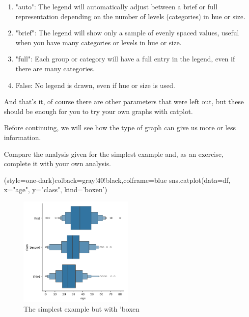 \documentclass[10pt]{extarticle}
\begin{document}
\begin{itemize}
    \begin{enumerate}
        \item "auto": The legend will automatically adjust between a brief or full representation depending on the number of levels (categories) in hue or size.
        \item "brief": The legend will show only a sample of evenly spaced values, useful when you have many categories or levels in hue or size.
        \item "full": Each group or category will have a full entry in the legend, even if there are many categories.
        \item False: No legend is drawn, even if hue or size is used.
    \end{enumerate}
\end{itemize}

And that's it, of course there are other parameters that were left out, but these should be enough for you to try your own graphs with catplot.

Before continuing, we will see how the type of graph can give us more or less information.

Compare the analysis given for the simplest example and, as an exercise, complete it with your own analysis.

\begin{python}(style=one-dark){colback=gray!40!black,colframe=blue}
sns.catplot(data=df, x="age", y="class", kind='boxen')
\end{python}

\begin{figure}[h!]
    \centering
    \includegraphics[width=0.5\textwidth]{img/catplot_2.png} 
    \caption{The simplest example but with 'boxen}
    \label{fig:imagen}
\end{figure}

\newpage
\end{document}
